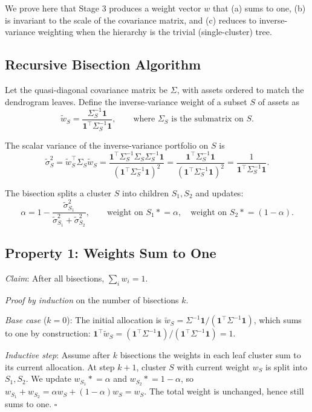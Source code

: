 We prove here that Stage 3 produces a weight vector $w$ that (a)
sums to one, (b) is invariant to the scale of the covariance matrix,
and (c) reduces to inverse-variance weighting when the hierarchy is
the trivial (single-cluster) tree.

\subsection{Recursive Bisection Algorithm}

Let the quasi-diagonal covariance matrix be $\Sigma$, with assets
ordered to match the dendrogram leaves. Define the inverse-variance
weight of a subset $S$ of assets as
\[
\tilde{w}_S = \frac{\Sigma_{S}^{-1} \mathbf{1}}{\mathbf{1}^\top \Sigma_S^{-1} \mathbf{1}}, \qquad \text{where } \Sigma_S \text{ is the submatrix on } S.
\]

The scalar variance of the inverse-variance portfolio on $S$ is
\[
\tilde{\sigma}_S^2 = \tilde{w}_S^\top \Sigma_S \tilde{w}_S
                    = \frac{\mathbf{1}^\top \Sigma_S^{-1} \Sigma_S \Sigma_S^{-1} \mathbf{1}}{(\mathbf{1}^\top \Sigma_S^{-1} \mathbf{1})^2}
                    = \frac{\mathbf{1}^\top \Sigma_S^{-1} \mathbf{1}}{(\mathbf{1}^\top \Sigma_S^{-1} \mathbf{1})^2}
                    = \frac{1}{\mathbf{1}^\top \Sigma_S^{-1} \mathbf{1}}.
\]

The bisection splits a cluster $S$ into children $S_1, S_2$ and updates:
\[
\alpha = 1 - \frac{\tilde{\sigma}_{S_1}^2}{\tilde{\sigma}_{S_1}^2 + \tilde{\sigma}_{S_2}^2}, \qquad
\text{weight on } S_1 \mathrel{*}= \alpha, \quad \text{weight on } S_2 \mathrel{*}= (1 - \alpha).
\]

\subsection{Property 1: Weights Sum to One}

\emph{Claim}: After all bisections, $\sum_i w_i = 1$.

\emph{Proof by induction} on the number of bisections $k$.

\emph{Base case} ($k = 0$): The initial allocation is
$\tilde{w}_S = \Sigma^{-1} \mathbf{1} / (\mathbf{1}^\top \Sigma^{-1} \mathbf{1})$,
which sums to one by construction:
$\mathbf{1}^\top \tilde{w}_S = (\mathbf{1}^\top \Sigma^{-1} \mathbf{1}) / (\mathbf{1}^\top \Sigma^{-1} \mathbf{1}) = 1$.

\emph{Inductive step}: Assume after $k$ bisections the weights in
each leaf cluster sum to its current allocation. At step $k+1$,
cluster $S$ with current weight $w_S$ is split into $S_1, S_2$. We
update $w_{S_1} \mathrel{*}= \alpha$ and $w_{S_2} \mathrel{*}= 1 -
\alpha$, so $w_{S_1} + w_{S_2} = \alpha w_S + (1 - \alpha) w_S = w_S$.
The total weight is unchanged, hence still sums to one. $\square$

